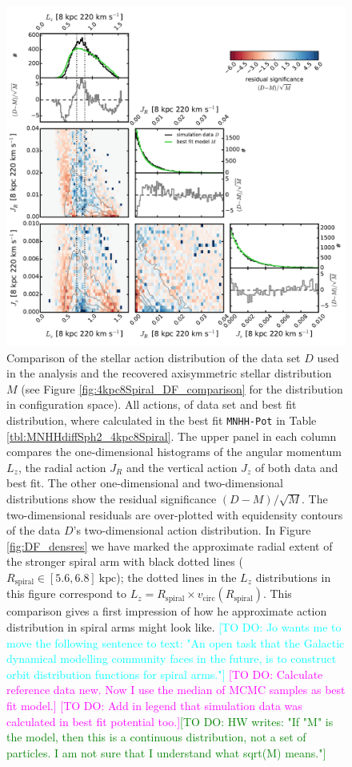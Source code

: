 \documentclass[iop,revtex4,numberedappendix,appendixfloats]{emulateapj}
\newcommand{\Wilma}[1]{\textcolor{Magenta}{#1}}
\newcommand{\HW}[1]{\textcolor{Green}{#1}}
\newcommand{\Jo}[1]{\textcolor{Cyan}{#1}}
\begin{document}
\begin{figure}[!htbp]
\centering
\includegraphics[width=\columnwidth]{fig/MNdHHdiffSph2_4kpc8Spiral_a_data_bestfit_residuals_only_actions.pdf}
\caption{Comparison of the stellar action distribution of the data set $D$ used in the analysis and the recovered axisymmetric stellar distribution $M$ (see Figure \ref{fig:4kpc8Spiral_DF_comparison} for the distribution in configuration space). All actions, of data set and best fit distribution, where calculated in the best fit \texttt{MNHH-Pot} in Table \ref{tbl:MNHHdiffSph2_4kpc8Spiral}. The upper panel in each column compares the one-dimensional histograms of the  angular momentum $L_z$, the radial action $J_R$ and the vertical action $J_z$ of both data and best fit. The other one-dimensional and two-dimensional distributions show the residual significance $(D-M)/\sqrt{M}$. The two-dimensional residuals are over-plotted with equidensity contours of the data $D$'s two-dimensional action distribution. In Figure \ref{fig:DF_densres} we have marked the approximate radial extent of the stronger spiral arm with black dotted lines ($R_\text{spiral} \in [5.6,6.8]~\text{kpc}$); the dotted lines in the $L_z$ distributions in this figure correspond to $L_z = R_\text{spiral} \times v_\text{circ}(R_\text{spiral})$. This comparison gives a first impression of how he approximate action distribution in spiral arms might look like. \Jo{[TO DO: Jo wants me to move the following sentence to text: "An open task that the Galactic dynamical modelling community faces in the future, is to construct orbit distribution functions for spiral arms."]} \Wilma{[TO DO: Calculate reference data new. Now I use the median of MCMC samples as best fit model.]} \Wilma{[TO DO: Add in legend that simulation data was calculated in best fit potential too.]}\HW{[TO DO: HW writes: "If "M" is the model, then this is a continuous distribution, not a set of particles. I am not sure that I understand what sqrt(M) means."]}}
\label{fig:4kpc8Spiral_actions}
\end{figure}
\end{document}
